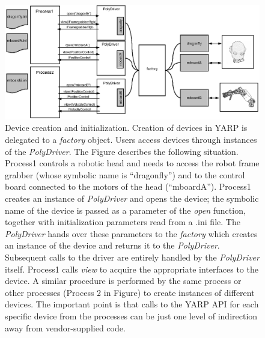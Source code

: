 %
%

\begin{figure}[tbp]
\centerline{
\includegraphics[width=20cm]{fig-devices4}
}
\caption{Device creation and initialization. Creation of 
devices in YARP is delegated to a \emph{factory} object. Users 
access devices through instances of the \emph{PolyDriver}. The 
Figure describes the following situation. Process1 controls a robotic
head and needs to access the robot frame grabber (whose symbolic name 
is ``dragonfly'') and to the control board connected to the motors of 
the head (``mboardA''). Process1 creates an instance of 
\emph{PolyDriver} and opens 
the device; the symbolic name of the device is passed as a parameter
of the \emph{open} function, together with initialization parameters 
read from a .ini file. The \emph{PolyDriver} hands over these parameters 
to the \emph{factory} which creates an instance of the device and returns
it to the \emph{PolyDriver}. Subsequent calls to the driver are entirely 
handled by the \emph{PolyDriver} itself. Process1 calls \emph{view} to 
acquire the appropriate interfaces to the device. A similar procedure 
is performed by the same process or other processes (Process 2 in Figure) 
to create instances of different devices.
The important point is that calls to the YARP API for 
each specific device from the processes can be just one 
level of indirection away from vendor-supplied code.
}\label{fig:devices4}
\end{figure}


